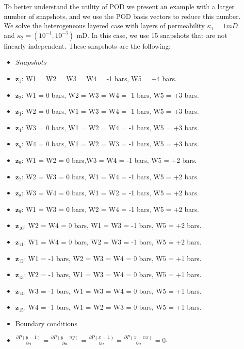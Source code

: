 \documentclass{ecmorXV}
\begin{document}
To better understand the utility of POD we present an example with a larger number of snapshots, and we use 
the POD basis vectors to reduce this number. We solve the heterogeneous layered case with layers of permeability 
$\kappa_1=1mD$ and $\kappa_2=(10^{-1}, 10^{-3})$ mD.
In this case, we use 15 snapshots that are not linearly independent.
These snapshots are the following:
\begin{itemize}
\item[] $Snapshots$ 
\item[] $\mathbf{z}_1$: W1 = W2 = W3 = W4 =  -1 bars, W5 =  +4 bars.
 \item[] $\mathbf{z}_2$: W1 = 0 bars, W2 = W3 = W4 =  -1 bars, W5 = +3 bars.
\item[] $\mathbf{z}_3$: W2 = 0 bars, W1 = W3 = W4 = -1 bars, W5 = +3 bars.
\item[] $\mathbf{z}_4$: W3 = 0 bars, W1 = W2 = W4 = -1 bars, W5 = +3 bars.
\item[] $\mathbf{z}_5$: W4 = 0 bars, W1 = W2 = W3 = -1 bars, W5 = +3 bars.
\item[] $\mathbf{z}_6$:  W1 = W2 = 0 bars,W3 = W4 = -1 bars, W5 =  +2 bars.
\item[] $\mathbf{z}_7$: W2 = W3 = 0 bars, W1 = W4 = -1 bars, W5 = +2 bars.
\item[] $\mathbf{z}_8$: W3 = W4 = 0 bars, W1 = W2 = -1 bars, W5 =  +2 bars.
 \item[] $\mathbf{z}_9$: W1 = W3 = 0 bars, W2 = W4 =  -1 bars, W5 = +2 bars.
\item[] $\mathbf{z}_{10}$: W2 = W4 = 0 bars, W1 = W3 = -1 bars, W5 =  +2 bars.
\item[] $\mathbf{z}_{11}$: W1 = W4 = 0 bars, W2 = W3 = -1 bars, W5 = +2 bars.
 \item[] $\mathbf{z}_{12}$: W1 = -1 bars, W2 = W3 = W4 =  0 bars, W5 =  +1 bars.
\item[] $\mathbf{z}_{13}$: W2 = -1 bars, W1 = W3 = W4 = 0 bars, W5 = +1 bars.
\item[] $\mathbf{z}_{14}$: W3 = -1 bars, W1 = W3 = W4 = 0 bars, W5 = +1 bars.
\item[] $\mathbf{z}_{15}$: W4 = -1 bars, W1 = W2 = W3 = 0 bars, W5 =  +1 bars.
 \item[] Boundary conditions 
\item[] $\frac{\partial P(y=1)}{\partial n}=\frac{\partial P(y=ny)}{\partial n}=\frac{\partial P(x=1)}{\partial n}=\frac{\partial P(x=nx)}{\partial n}=0$.
\end{itemize}
\end{document}
